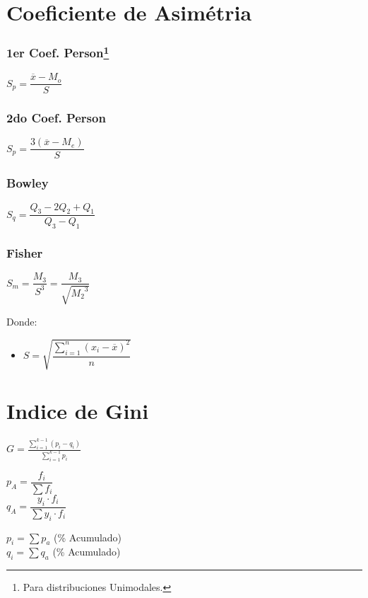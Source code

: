 \documentclass[10pt,letterpaper]{article}
\begin{document}
\section{Coeficiente de Asimétria}
\begin{multicols}{4}
\subsubsection*{1er Coef. Person\footnote{Para distribuciones Unimodales.}}
$S_p=\dfrac{\overline{x}-M_o}{S}$
\columnbreak
\subsubsection*{2do Coef. Person}
$S_p=\dfrac{3(\overline{x}-M_e)}{S}$
\columnbreak
\subsubsection*{Bowley}
$S_q=\dfrac{Q_3-2Q_2+Q_1}{Q_3-Q_1}$
\columnbreak
\subsubsection*{Fisher}
$S_m=\dfrac{M_3}{S^3}=\dfrac{M_3}{\sqrt{{M_2}^3}}$
\end{multicols}
Donde:
\begin{itemize}
\item $S=\sqrt{\dfrac{\displaystyle\sum_{i=1}^{n}(x_i-\overline{x})^2}{n}}$
\end{itemize}
\section{Indice de Gini}

\begin{multicols}{3}
\begin{flushleft}
$G=\frac{\displaystyle\sum_{i=1}^{k-1} (p_i-q_i)}{\displaystyle\sum_{i=1}^{k-1} p_i}$
\end{flushleft}

\columnbreak
\begin{flushleft}
$p_A=\dfrac{f_i}{\sum f_i}$\\
\vspace{0.2cm}
$q_A=\dfrac{y_i\cdot f_i}{\sum y_i\cdot f_i}$
\end{flushleft}
\columnbreak
$p_i=\sum p_a$ (\% Acumulado)\\

\vspace{0.3cm}
\noindent $q_i=\sum q_a$ (\% Acumulado)
\end{multicols}
\end{document}
